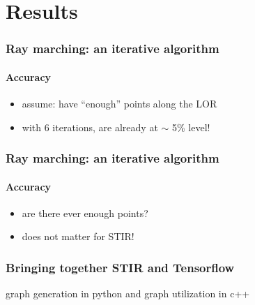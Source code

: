 \documentclass{beamer}
\begin{document}
\section{Results}
\begin{frame}
  \frametitle{Ray marching: an iterative algorithm}
  \framesubtitle{Accuracy}
  \begin{itemize}
    \item assume: have ``enough'' points along the LOR
  \end{itemize}
  \begin{figure}
    \centering
  \end{figure}
  \begin{itemize}
    \item with 6 iterations, are already at $\sim$ 5\% level!
  \end{itemize}
\end{frame}

\begin{frame}
  \frametitle{Ray marching: an iterative algorithm}
  \framesubtitle{Accuracy}
  \begin{itemize}
    \item are there ever enough points?
  \end{itemize}

  \begin{itemize}
    \item does not matter for STIR!
  \end{itemize}
\end{frame}

\begin{frame}
  \frametitle{Bringing together STIR and Tensorflow}
  graph generation in python and graph utilization in c++
\end{frame}
\end{document}
